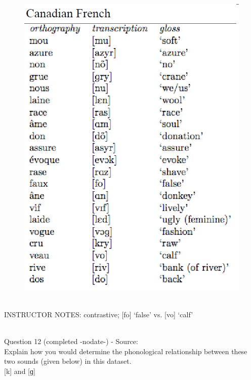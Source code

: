 \documentclass[12pt]{article}
\begin{document}
\begin{figure}[H]
\includegraphics{../images/canadianfrench.png}
\end{figure}

~\\
INSTRUCTOR NOTES: contrastive; [fo] ‘false’ vs. [vo] ‘calf’


~\\

{\large Question 12} (completed -nodate-) - Source: \\

Explain how you would determine the phonological relationship between these two sounds (given below) in this dataset.\\

{[k]} and {[ɡ]}
\end{document}

